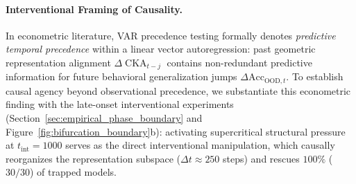 \documentclass{article}
\theoremstyle{plain}
\theoremstyle{definition}
\DeclareMathOperator{\CKA}{CKA}
\begin{document}
\paragraph{Interventional Framing of Causality.}
In econometric literature, VAR precedence testing formally denotes \emph{predictive temporal precedence} within a linear vector autoregression: past geometric representation alignment $\Delta \CKA_{t-j}$ contains non-redundant predictive information for future behavioral generalization jumps $\Delta \text{Acc}_{\text{OOD}, t}$. To establish causal agency beyond observational precedence, we substantiate this econometric finding with the late-onset interventional experiments (Section~\ref{sec:empirical_phase_boundary} and Figure~\ref{fig:bifurcation_boundary}b): activating supercritical structural pressure at $t_{\text{int}} = 1000$ serves as the direct interventional manipulation, which causally reorganizes the representation subspace ($\Delta t \approx 250$ steps) and rescues $100\%$ ($30/30$) of trapped models.
\end{document}
